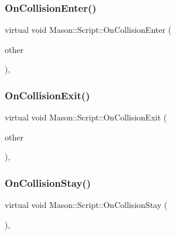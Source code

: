 \subsubsection{\texorpdfstring{On\+Collision\+Enter()}{OnCollisionEnter()}}
{\footnotesize\ttfamily virtual void Mason\+::\+Script\+::\+On\+Collision\+Enter (\begin{DoxyParamCaption}\item[{\hyperlink{class_mason_1_1_game_object}{Game\+Object} $\ast$}]{other }\end{DoxyParamCaption})\hspace{0.3cm}{\ttfamily [inline]}, {\ttfamily [virtual]}}

\hypertarget{class_mason_1_1_script_a04d09648b7dba1bcb0a0ad3c3570e2f3}{}\label{class_mason_1_1_script_a04d09648b7dba1bcb0a0ad3c3570e2f3} 
\subsubsection{\texorpdfstring{On\+Collision\+Exit()}{OnCollisionExit()}}
{\footnotesize\ttfamily virtual void Mason\+::\+Script\+::\+On\+Collision\+Exit (\begin{DoxyParamCaption}\item[{\hyperlink{class_mason_1_1_game_object}{Game\+Object} $\ast$}]{other }\end{DoxyParamCaption})\hspace{0.3cm}{\ttfamily [inline]}, {\ttfamily [virtual]}}

\hypertarget{class_mason_1_1_script_a9649674f058f8e1b9229e93f3d9a34d7}{}\label{class_mason_1_1_script_a9649674f058f8e1b9229e93f3d9a34d7} 
\subsubsection{\texorpdfstring{On\+Collision\+Stay()}{OnCollisionStay()}}
{\footnotesize\ttfamily virtual void Mason\+::\+Script\+::\+On\+Collision\+Stay (\begin{DoxyParamCaption}{ }\end{DoxyParamCaption})\hspace{0.3cm}{\ttfamily [inline]}, {\ttfamily [virtual]}}

